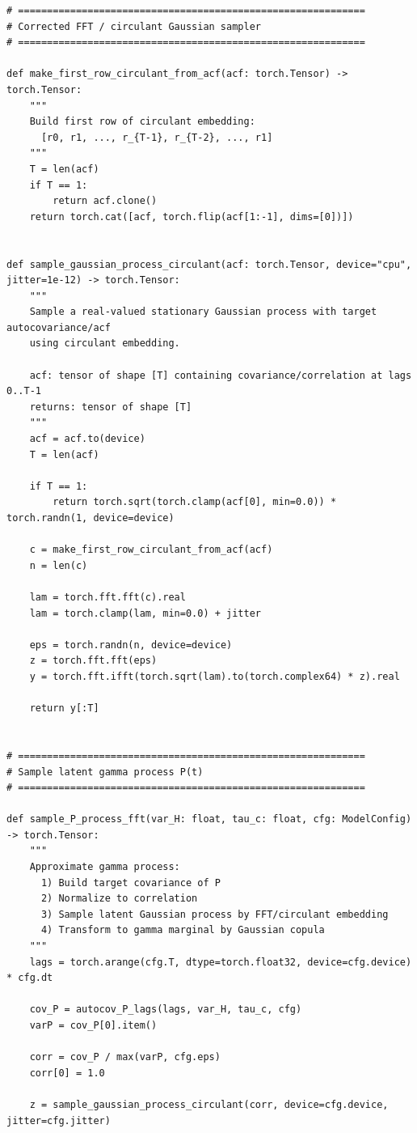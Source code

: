 \documentclass{article}
\begin{document}
\begin{verbatim}
# ============================================================
# Corrected FFT / circulant Gaussian sampler
# ============================================================

def make_first_row_circulant_from_acf(acf: torch.Tensor) -> torch.Tensor:
    """
    Build first row of circulant embedding:
      [r0, r1, ..., r_{T-1}, r_{T-2}, ..., r1]
    """
    T = len(acf)
    if T == 1:
        return acf.clone()
    return torch.cat([acf, torch.flip(acf[1:-1], dims=[0])])


def sample_gaussian_process_circulant(acf: torch.Tensor, device="cpu", jitter=1e-12) -> torch.Tensor:
    """
    Sample a real-valued stationary Gaussian process with target autocovariance/acf
    using circulant embedding.

    acf: tensor of shape [T] containing covariance/correlation at lags 0..T-1
    returns: tensor of shape [T]
    """
    acf = acf.to(device)
    T = len(acf)

    if T == 1:
        return torch.sqrt(torch.clamp(acf[0], min=0.0)) * torch.randn(1, device=device)

    c = make_first_row_circulant_from_acf(acf)
    n = len(c)

    lam = torch.fft.fft(c).real
    lam = torch.clamp(lam, min=0.0) + jitter

    eps = torch.randn(n, device=device)
    z = torch.fft.fft(eps)
    y = torch.fft.ifft(torch.sqrt(lam).to(torch.complex64) * z).real

    return y[:T]


# ============================================================
# Sample latent gamma process P(t)
# ============================================================

def sample_P_process_fft(var_H: float, tau_c: float, cfg: ModelConfig) -> torch.Tensor:
    """
    Approximate gamma process:
      1) Build target covariance of P
      2) Normalize to correlation
      3) Sample latent Gaussian process by FFT/circulant embedding
      4) Transform to gamma marginal by Gaussian copula
    """
    lags = torch.arange(cfg.T, dtype=torch.float32, device=cfg.device) * cfg.dt

    cov_P = autocov_P_lags(lags, var_H, tau_c, cfg)
    varP = cov_P[0].item()

    corr = cov_P / max(varP, cfg.eps)
    corr[0] = 1.0

    z = sample_gaussian_process_circulant(corr, device=cfg.device, jitter=cfg.jitter)


\end{verbatim}
\end{document}
